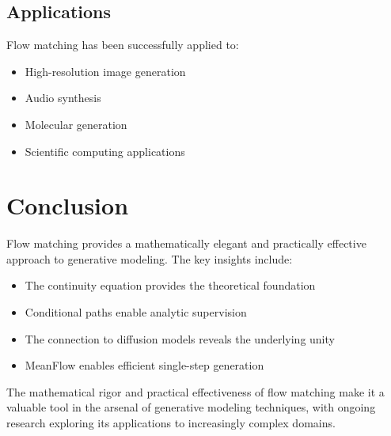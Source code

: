 \subsection{Applications}

Flow matching has been successfully applied to:
\begin{itemize}
    \item High-resolution image generation
    \item Audio synthesis
    \item Molecular generation
    \item Scientific computing applications
\end{itemize}

\section{Conclusion}

Flow matching provides a mathematically elegant and practically effective approach to generative modeling. The key insights include:

\begin{itemize}
    \item The continuity equation provides the theoretical foundation
    \item Conditional paths enable analytic supervision
    \item The connection to diffusion models reveals the underlying unity
    \item MeanFlow enables efficient single-step generation
\end{itemize}

The mathematical rigor and practical effectiveness of flow matching make it a valuable tool in the arsenal of generative modeling techniques, with ongoing research exploring its applications to increasingly complex domains.
